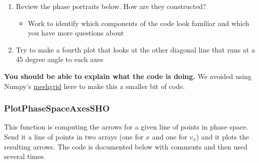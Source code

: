 \begin{enumerate}
\def\labelenumi{\arabic{enumi}.}
\tightlist
\item
  Review the phase portraits below. How are they constructed?

  \begin{itemize}
  \tightlist
  \item
    Work to identify which components of the code look familiar and
    which you have more questions about
  \end{itemize}
\item
  Try to make a fourth plot that looks at the other diagonal line that
  runs at a 45 degree angle to each axes
\end{enumerate}

\textbf{You should be able to explain what the code is doing.} We
avoided using Numpy's
\href{https://numpy.org/doc/stable/reference/generated/numpy.meshgrid.html}{meshgrid}
here to make this a smaller bit of code.

\subsubsection{PlotPhaseSpaceAxesSHO}\label{plotphasespaceaxessho}

This function is computing the arrows for a given line of points in
phase space. Send it a line of points in two arrays (one for \(x\) and
one for \(v_x\)) and it plots the resulting arrows. The code is
documented below with comments and then used several times.

